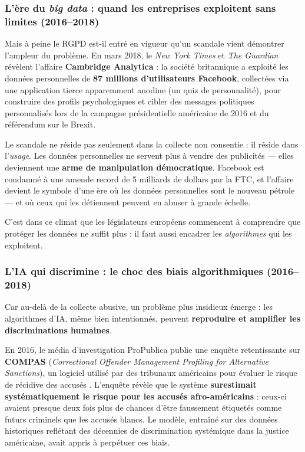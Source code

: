 \documentclass[12pt,a4paper]{article}
\begin{document}
\subsubsection{L'ère du \textit{big data} : quand les entreprises exploitent sans limites (2016--2018)}

Mais à peine le RGPD est-il entré en vigueur qu'un scandale vient démontrer l'ampleur du problème. En mars 2018, le \textit{New York Times} et \textit{The Guardian} révèlent l'affaire \textbf{Cambridge Analytica} \cite{cambridge_analytica} : la société britannique a exploité les données personnelles de \textbf{87 millions d'utilisateurs Facebook}, collectées via une application tierce apparemment anodine (un quiz de personnalité), pour construire des profils psychologiques et cibler des messages politiques personnalisés lors de la campagne présidentielle américaine de 2016 et du référendum sur le Brexit.

Le scandale ne réside pas seulement dans la collecte non consentie : il réside dans l'\textit{usage}. Les données personnelles ne servent plus à vendre des publicités --- elles deviennent une \textbf{arme de manipulation démocratique}. Facebook est condamné à une amende record de 5 milliards de dollars par la FTC, et l'affaire devient le symbole d'une ère où les données personnelles sont le nouveau pétrole --- et où ceux qui les détiennent peuvent en abuser à grande échelle.

C'est dans ce climat que les législateurs européens commencent à comprendre que protéger les données ne suffit plus : il faut aussi encadrer les \textit{algorithmes} qui les exploitent.

\subsubsection{L'IA qui discrimine : le choc des biais algorithmiques (2016--2018)}

Car au-delà de la collecte abusive, un problème plus insidieux émerge : les algorithmes d'IA, même bien intentionnés, peuvent \textbf{reproduire et amplifier les discriminations humaines}.

En 2016, le média d'investigation ProPublica publie une enquête retentissante sur \textbf{COMPAS} (\textit{Correctional Offender Management Profiling for Alternative Sanctions}), un logiciel utilisé par des tribunaux américains pour évaluer le risque de récidive des accusés \cite{propublica_compas}. L'enquête révèle que le système \textbf{surestimait systématiquement le risque pour les accusés afro-américains} : ceux-ci avaient presque deux fois plus de chances d'être faussement étiquetés comme futurs criminels que les accusés blancs. Le modèle, entraîné sur des données historiques reflétant des décennies de discrimination systémique dans la justice américaine, avait appris à perpétuer ces biais.
\end{document}
